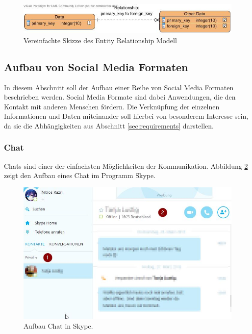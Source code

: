 \documentclass[a4paper]{article}
\begin{document}
	\begin{figure}[H] 
		\includegraphics[width=\linewidth]{../Bilder/ent_rel.jpg}
		\caption{Vereinfachte Skizze des Entity Relationship Modell}
		\label{fig:ent_rel}
	\end{figure}	
	
	\subsection{Aufbau von Social Media Formaten}	
	\label{sec:social}
	
	In diesem Abschnitt soll der Aufbau einer Reihe von Social Media Formaten
	beschrieben werden. Social Media Formate sind dabei Anwendungen, die
	den Kontakt mit anderen Menschen fördern. Die Verknüpfung der einzelnen
	Informationen und Daten miteinander soll hierbei von besonderem Interesse sein,
	da sie die Abhängigkeiten aus Abschnitt \ref{sec:requirements} darstellen.
	
	\subsubsection{Chat}	
	
	Chats sind einer der einfachsten Möglichkeiten der Kommunikation. Abbildung
	\ref{fig:chat} zeigt den Aufbau eines Chat im Programm Skype.
	
	\begin{figure}[H] 
		\centerline{
			\includegraphics[scale=0.58]{../Bilder/chat.jpg}
		}
		\caption{Aufbau Chat in Skype. \cite{chat}}
		\label{fig:chat}
	\end{figure}		
	
\end{document}

